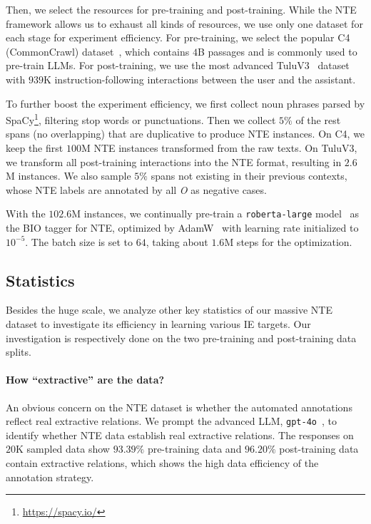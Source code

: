 Then, we select the resources for pre-training and post-training. While the NTE framework allows us to exhaust all kinds of resources, we use only one dataset for each stage for experiment efficiency. For pre-training, we select the popular C4 (CommonCrawl) dataset~\citep{t5}, which contains $4$B passages and is commonly used to pre-train LLMs. For post-training, we use the most advanced TuluV3~\cite{tulu3} dataset with $939$K instruction-following interactions between the user and the assistant.

To further boost the experiment efficiency, we first collect noun phrases parsed by SpaCy\footnote{\href{https://spacy.io/}{https://spacy.io/}}, filtering stop words or punctuations. Then we collect $5\%$ of the rest spans (no overlapping) that are duplicative to produce NTE instances. On C4, we keep the first $100$M NTE instances transformed from the raw texts. On TuluV3, we transform all post-training interactions into the NTE format, resulting in $2.6$M instances. We also sample $5\%$ spans not existing in their previous contexts, whose NTE labels are annotated by all \textit{O} as negative cases.

With the $102.6$M instances, we continually pre-train a \texttt{roberta-large} model~\citep{roberta} as the BIO tagger for NTE, optimized by AdamW~\citep{AdamW} with learning rate initialized to $10^{-5}$. The batch size is set to $64$, taking about $1.6$M steps for the optimization.


\subsection{Statistics}

Besides the huge scale, we analyze other key statistics of our massive NTE dataset to investigate its efficiency in learning various IE targets. Our investigation is respectively done on the two pre-training and post-training data splits. 

\paragraph{How ``extractive'' are the data?} An obvious concern on the NTE dataset is whether the automated annotations reflect real extractive relations. We prompt the advanced LLM, \texttt{gpt-4o}~\citep{achiam2023gpt4}, to identify whether NTE data establish real extractive relations. The responses on $20$K sampled data show $93.39\%$ pre-training data and $96.20\%$ post-training data contain extractive relations, which shows the high data efficiency of the annotation strategy.


